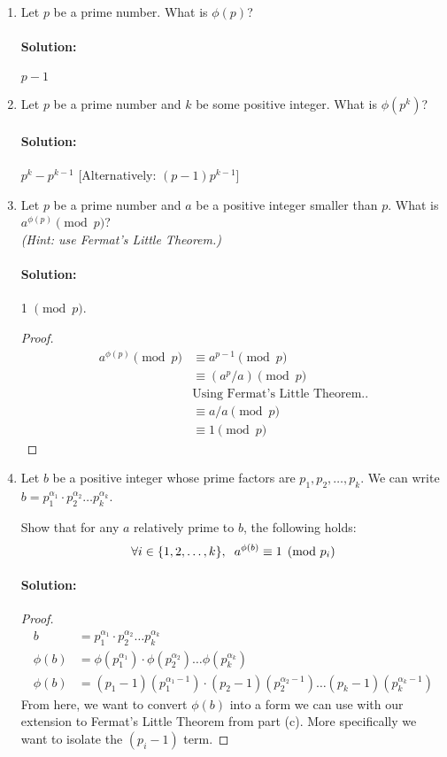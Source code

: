 \documentclass[11pt, notitlepage]{report}
\newenvironment{solution}{\paragraph{Solution:}}{\hfill}
\begin{document}
  \begin{enumerate}[label=(\alph*)]
  \item
    Let $p$ be a prime number.
    What is $\phi(p)$?
    \begin{solution}
    	$p-1$
    \end{solution}

    \item
    Let $p$ be a prime number and $k$ be some positive integer.
    What is $\phi(p^k)$?
	\begin{solution}
		$p^k-p^{k-1}$ [Alternatively: $(p-1)p^{k-1}$]
	\end{solution}

    \item
    Let $p$ be a prime number and $a$ be a positive integer smaller than $p$.
    What is $a^{\phi(p)} \pmod{p}$?\\\emph{(Hint: use Fermat's Little Theorem.)}
    \begin{solution} 1 $\pmod{p}$. 
    	\begin{proof}
    		\begin{align*}
    			a^{\phi(p)} \pmod{p} &\equiv a^{p-1}\pmod{p} \\
    			&\equiv (a^p/a) \pmod{p} \\
    			&\text{Using Fermat's Little Theorem..} \\
    			&\equiv a / a \pmod{p} \\
    			&\equiv 1 \pmod{p}
    		\end{align*}
    	\end{proof}
    \end{solution}

	\newpage
    \item
    Let $b$ be a positive integer whose prime factors are $p_1,p_2,\hdots, p_k$.
    We can write $b = p_1^{\alpha_1}\cdot p_2^{\alpha_2} \hdots p_k^{\alpha_k}$.

    Show that for any $a$ relatively prime to $b$, the following holds:
    $$\forall i \in \{1,2,\hdots,k\}, \hspace{0.2cm} a^{\phi(b)} \equiv 1 \pmod{p_i}$$
    \begin{solution}
    \begin{proof}
    	
    	\begin{align}
    		b &= p_1^{\alpha_1}\cdot p_2^{\alpha_2} \hdots p_k^{\alpha_k} \\
    		\phi{(b)} &= \phi{(p_1^{\alpha_1})}\cdot \phi{(p_2^{\alpha_2})} \hdots \phi{(p_k^{\alpha_k})} \\
    		\phi{(b)} &= (p_1-1)(p_1^{\alpha_1 - 1}) \cdot (p_2 - 1)(p_2^{\alpha_2 - 1}) \hdots (p_k - 1)(p_k^{\alpha_k - 1}) \label{eq:1}
    	\end{align}
    	From here, we want to convert $\phi{(b)}$ into a form we can use with our extension to Fermat's Little Theorem from part (c). More specifically we want to isolate the $(p_i -  1)$ term.
    	

\end{proof}
\end{solution}
\end{enumerate}
\end{document}
